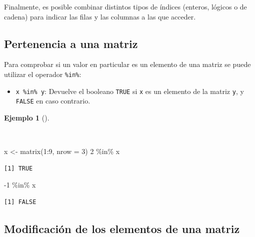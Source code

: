 \documentclass[
  spanish,
  a4paper,
]{scrreport}
\newenvironment{Shaded}{\begin{snugshade}}{\end{snugshade}}
\newcommand{\AttributeTok}[1]{\textcolor[rgb]{0.40,0.45,0.13}{#1}}
\newcommand{\DecValTok}[1]{\textcolor[rgb]{0.68,0.00,0.00}{#1}}
\newcommand{\FunctionTok}[1]{\textcolor[rgb]{0.28,0.35,0.67}{#1}}
\newcommand{\NormalTok}[1]{\textcolor[rgb]{0.00,0.23,0.31}{#1}}
\newcommand{\OtherTok}[1]{\textcolor[rgb]{0.00,0.23,0.31}{#1}}
\newcommand{\SpecialCharTok}[1]{\textcolor[rgb]{0.37,0.37,0.37}{#1}}
\providecommand{\tightlist}{%
  \setlength{\itemsep}{0pt}\setlength{\parskip}{0pt}}
\theoremstyle{definition}
\theoremstyle{definition}
\newtheorem{example}{Ejemplo}[chapter]
\theoremstyle{remark}
\begin{document}
Finalmente, es posible combinar distintos tipos de índices (enteros,
lógicos o de cadena) para indicar las filas y las columnas a las que
acceder.

\subsection{Pertenencia a una matriz}\label{pertenencia-a-una-matriz}

Para comprobar si un valor en particular es un elemento de una matriz se
puede utilizar el operador \texttt{\%in\%}:

\begin{itemize}
\tightlist
\item
  \texttt{x\ \%in\%\ y}: Devuelve el booleano \texttt{TRUE} si
  \texttt{x} es un elemento de la matriz \texttt{y}, y \texttt{FALSE} en
  caso contrario.
\end{itemize}

\begin{example}[]\protect\hypertarget{exm-pertenencia-matriz}{}\label{exm-pertenencia-matriz}

~

\begin{Shaded}
\begin{Highlighting}[]
\NormalTok{x }\OtherTok{\textless{}{-}} \FunctionTok{matrix}\NormalTok{(}\DecValTok{1}\SpecialCharTok{:}\DecValTok{9}\NormalTok{, }\AttributeTok{nrow =} \DecValTok{3}\NormalTok{)}
\DecValTok{2} \SpecialCharTok{\%in\%}\NormalTok{ x}
\end{Highlighting}
\end{Shaded}

\begin{verbatim}
[1] TRUE
\end{verbatim}

\begin{Shaded}
\begin{Highlighting}[]
\SpecialCharTok{{-}}\DecValTok{1} \SpecialCharTok{\%in\%}\NormalTok{ x}
\end{Highlighting}
\end{Shaded}

\begin{verbatim}
[1] FALSE
\end{verbatim}

\end{example}

\subsection{Modificación de los elementos de una
matriz}\label{modificaciuxf3n-de-los-elementos-de-una-matriz}
\end{document}
